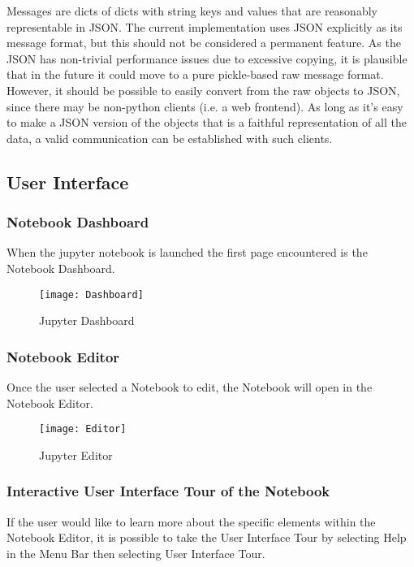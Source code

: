Messages are dicts of dicts with string keys and values that are reasonably representable
in JSON. The current implementation uses JSON explicitly as its message format, but this
should not be considered a permanent feature. As the JSON has non-trivial performance
issues due to excessive copying, it is plausible that in the future it could move to a
pure pickle-based raw message format. However, it should be possible to easily convert
from the raw objects to JSON, since there may be non-python clients (i.e. a web
frontend). As long as it's easy to make a JSON version of the objects that is a faithful
representation of all the data, a valid communication can be established with such
clients.

\subsection{User Interface}

\subsubsection{Notebook Dashboard}
 
When the jupyter notebook is launched the first page encountered is the Notebook Dashboard. 

\begin{figure}[ht]\centering
  \texttt{[image: Dashboard]}
  \caption{Jupyter Dashboard}\label{fig:dashboard}
\end{figure} 

\subsubsection{Notebook Editor}
 
Once the user selected a Notebook to edit, the Notebook will open in the Notebook Editor. 

\begin{figure}[ht]\centering
  \texttt{[image: Editor]}
  \caption{Jupyter Editor}\label{fig:editor}
\end{figure} 

\subsubsection{Interactive User Interface Tour of the Notebook}
If the user would like to learn more about the specific elements within the Notebook Editor,
it is possible to take the User Interface Tour by selecting Help in the Menu Bar then selecting User Interface Tour.

